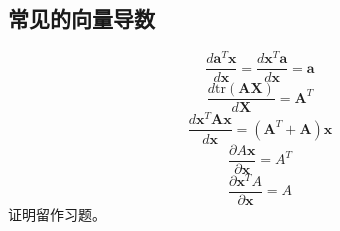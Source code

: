 \documentclass[11pt,fleqn, UTF8]{ctexbook} %
\begin{document}
\subsection{常见的向量导数}
\begin{equation}\label{ex1}
  \frac{d\boldsymbol{a}^T\boldsymbol{x}}{d\boldsymbol{x}}=\frac{d\boldsymbol{x}^T\boldsymbol{a}}{d\boldsymbol{x}}=\boldsymbol{a}
\end{equation}
\begin{equation}\label{ex2}
  \frac{d\text{tr}(\boldsymbol{AX})}{d\boldsymbol{X}}=\boldsymbol{A}^T
\end{equation}
\begin{equation}\label{ex3}
  \frac{d\boldsymbol{x}^T\boldsymbol{Ax}}{d\boldsymbol{x}}=(\boldsymbol{A}^T+\boldsymbol{A})\boldsymbol{x}
\end{equation}
\begin{equation}\label{2.11}
  \frac{\partial A\boldsymbol{x}}{\partial\boldsymbol{x}}=A^T
\end{equation}
\begin{equation}\label{2.12}
  \frac{\partial\boldsymbol{x}^TA}{\partial\boldsymbol{x}}=A
\end{equation}
证明留作习题。
\end{document}
